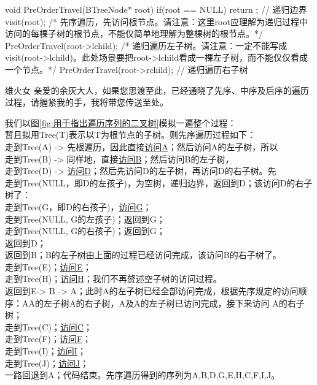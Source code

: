 \begin{cppcodeNum}[label={code:先序遍历二叉树}]
    void PreOrderTravel(BTreeNode* root) {
        if(root == NULL) return ;   // 递归边界
        visit(root);    /* 先序遍历，先访问根节点。请注意：这里root应理解为递归过程中访问的每棵子树的根节点，不能仅简单地理解为整棵树的根节点。*/
        PreOrderTravel(root->lchild);   /* 递归遍历左子树。请注意：一定不能写成 visit(root->lchild)。此处场景要把root->lchild看成一棵左子树，而不能仅仅看成一个节点。*/
        PreOrderTravel(root->rchild);   // 递归遍历右子树
    }
\end{cppcodeNum}

\begin{notebox}{维火女}
    亲爱的余灰大人，如果您思渡至此，已经通晓了先序、中序及后序的遍历过程，请握紧我的手，我将带您传送至处。
\end{notebox}

我们以图\ref{fig:用于指出遍历序列的二叉树}模拟一遍整个过程：\\

暂且拟用Tree(T)表示以T为根节点的子树。则先序遍历过程如下：\\[0.5em]
走到Tree(A) -> 先根遍历，因此直接\uline{访问A}；然后访问A的左子树，所以\\[0.5em]
走到Tree(B) -> 同样地，直接\uline{访问B}；然后访问B的左子树，\\[0.5em]
走到Tree(D) -> \uline{访问D}；然后先访问D的左子树，再访问D的右子树。先\\[0.5em]
走到Tree(NULL，即D的左孩子)，为空树，递归边界，返回到D；该访问D的右子树了：\\[0.5em]
走到Tree(G，即D的右孩子)，\uline{访问G}； \\[0.5em]
走到Tree(NULL, G的左孩子)；返回到G；\\[0.5em]
走到Tree(NULL, G的右孩子)；返回到G；\\[0.5em]
返回到D；\\[0.5em]
返回到B；B的左子树由上面的过程已经访问完成，该访问B的右子树了。\\[0.5em]
走到Tree(E)；\uline{访问E}；\\[0.5em]
走到Tree(H)；\uline{访问H}；我们不再赘述空子树的访问过程。\\[0.5em]
返回到E-> B -> A；此时A的左子树已经全部访问完成，根据先序规定的访问顺序：A\;A的左子树\;A的右子树，A及A的左子树已访问完成，接下来访问
A的右子树；\\[0.5em]
走到Tree(C)；\uline{访问C}；\\[0.5em]
走到Tree(F)；\uline{访问F}；\\[0.5em]
走到Tree(I)；\uline{访问I}；\\[0.5em]
走到Tree(J)；\uline{访问J}；\\[0.5em]
一路回退到A；代码结束。先序遍历得到的序列为A,B,D,G,E,H,C,F,I,J。\\

